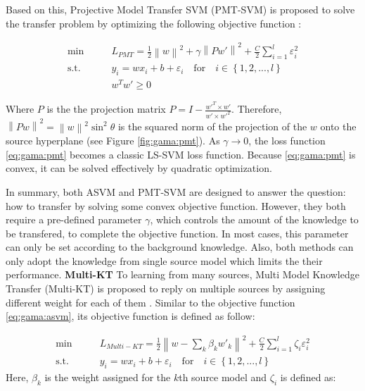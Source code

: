 Based on this, Projective Model Transfer SVM (PMT-SVM) is proposed to solve the transfer problem by optimizing the following objective function \cite{aytar2011tabula}:

\begin{equation}\label{eq:gama:pmt}
\begin{aligned}
\min \qquad& {L_{PMT}} = \frac{1}{2}{\left\| w \right\|^2} + \gamma {\left\| {Pw'} \right\|^2} + \frac{C}{2}\sum\limits_{i = 1}^l {\varepsilon _i^2} \\
\text{s.t.}\qquad&{y_i} = w{x_i} + b + {\varepsilon _i} \quad   \text{for} \quad i \in \left\{ {1,2,...,l} \right\}\\
& w^Tw' \ge 0
\end{aligned}
\end{equation}

Where $P$ is the the projection matrix $P = I - \frac{{w{'^T} \times w'}}{{w' \times w{'^T}}}$. Therefore, ${\left\| {Pw} \right\|^2} = {\left\| w \right\|^2}{\sin ^2}\theta $ is the
squared norm of the projection of the $w$ onto the source hyperplane (see Figure \ref{fig:gama:pmt}). As $\gamma \rightarrow 0$, the loss function \eqref{eq:gama:pmt} becomes a classic LS-SVM loss function. Because \eqref{eq:gama:pmt} is convex, it can be solved effectively by quadratic optimization.

In summary, both ASVM and PMT-SVM are designed to answer the question: how to transfer by solving some convex objective function. However, they both require a pre-defined parameter $\gamma$, which controls the amount of the knowledge to be transfered, to complete the objective function. In most cases, this parameter can only be set according to the background knowledge. Also, both methods can only adopt the knowledge from single source model which limits the their performance. 
\textbf{Multi-KT}
To learning from many sources, Multi Model Knowledge Transfer (Multi-KT) is proposed to reply on multiple sources by assigning different weight for each of them \cite{tommasi2014learning}. Similar to the objective function \eqref{eq:gama:asvm}, its objective function is defined as follow: 

\begin{equation}\label{eq:gama:multi}
\begin{aligned}
\min \qquad& {L_{Multi - KT}} = \frac{1}{2}{\left\| {w - \sum\limits_k {{\beta _k}} {{w'}_k}} \right\|^2} + \frac{C}{2}\sum\limits_{i = 1}^l {{\zeta _i}\varepsilon _i^2}  \\
\text{s.t.}\qquad&{y_i} = w{x_i} + b + {\varepsilon _i} \quad   \text{for} \quad i \in \left\{ {1,2,...,l} \right\}
\end{aligned}
\end{equation}
Here, $\beta_k$ is the weight assigned for the $k$th source model and $\zeta _i$ is defined as:

